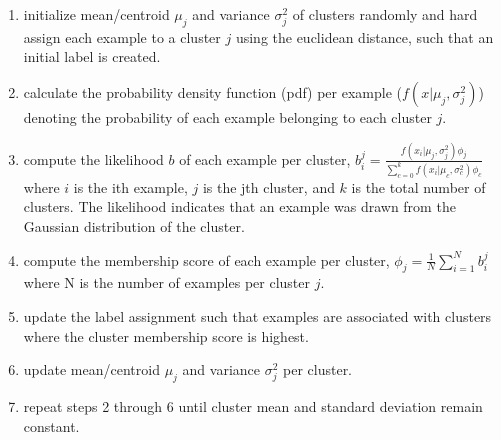 \documentclass{ieeeaccess}
\begin{document}
\begin{enumerate}
\item initialize mean/centroid $\mu_{j}$ and variance $\sigma^{2}_{j}$ of clusters randomly and hard assign each example to a cluster $j$ using the euclidean distance, such that an initial label is created.  
\item calculate the probability density function (pdf) per example  ($f(x|\mu_j, \sigma^{2}_j)$) denoting the probability of each example belonging to each cluster $j$.
\item compute the likelihood $b$ of each example per cluster, $b_{i}^{j} = \frac{f(x_{i}|\mu_{j}, \sigma^{2}_{j})\phi_{j}}{\sum_{c=0}^{k}f(x_{i}|\mu_{c}, \sigma^{2}_{c})\phi_{c}}$ where $i$ is the ith example, $j$ is the jth cluster, and $k$ is the total number of clusters. The likelihood indicates that an example was drawn from the Gaussian distribution of the cluster.
\item compute the membership score of each example per cluster, $\phi_{j} = \frac{1}{N}\sum_{i=1}^{N}b_{i}^{j}$ where N is the number of examples per cluster $j$.
\item update the label assignment such that examples are associated with clusters where the cluster membership score is highest.
\item update mean/centroid $\mu_{j}$ and variance $\sigma^{2}_{j}$ per cluster.
\item repeat steps 2 through 6 until cluster mean and standard deviation remain constant.
\end{enumerate}
\end{document}
